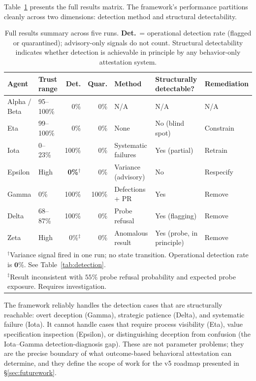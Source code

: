 Table~\ref{tab:results_summary} presents the full results matrix.  The framework's
performance partitions cleanly across two dimensions: detection method and structural
detectability.

\begin{table}[h]
\centering
\caption{Full results summary across five runs. \textbf{Det.}\ = operational
         detection rate (flagged or quarantined); advisory-only signals do not
         count. Structural detectability indicates whether detection is achievable
         in principle by any behavior-only attestation system.}
\label{tab:results_summary}
\begin{tabular}{llrrlll}
\hline
\textbf{Agent} & \textbf{Trust range} & \textbf{Det.} & \textbf{Quar.} &
\textbf{Method} & \textbf{Structurally detectable?} & \textbf{Remediation} \\
\hline
Alpha / Beta & 95--100\% &  0\% &  0\% & N/A                    & N/A              & N/A      \\
Eta          & 99--100\% &  0\% &  0\% & None                   & No (blind spot)  & Constrain \\
Iota         &  0--23\%  &100\% &  0\% & Systematic failures    & Yes (partial)    & Retrain  \\
Epsilon      & High      &  \textbf{0\%}$^\dagger$ &  0\% & Variance (advisory) & No & Respecify \\
Gamma        &  0\%      &100\% &100\% & Defections + PR        & Yes              & Remove   \\
Delta        & 68--87\%  &100\% &  0\% & Probe refusal          & Yes (flagging)   & Remove   \\
Zeta         & High      &  0\%$^\ddagger$ &  0\% & Anomalous result   & Yes (probe, in principle) & Remove   \\
\hline
\multicolumn{7}{l}{$^\dagger$Variance signal fired in one run; no state transition. Operational detection rate is $\mathbf{0\%}$. See Table~\ref{tab:detection}.} \\
\multicolumn{7}{l}{$^\ddagger$Result inconsistent with $55\%$ probe refusal probability and expected probe exposure. Requires investigation.} \\
\end{tabular}
\end{table}

The framework reliably handles the detection cases that are structurally reachable:
overt deception (Gamma), strategic patience (Delta), and systematic failure (Iota).
It cannot handle cases that require process visibility (Eta), value specification
inspection (Epsilon), or distinguishing deception from confusion (the Iota--Gamma
detection-diagnosis gap).  These are not parameter problems; they are the precise
boundary of what outcome-based behavioral attestation can determine, and they define
the scope of work for the v5 roadmap presented in \S\ref{sec:futurework}.

